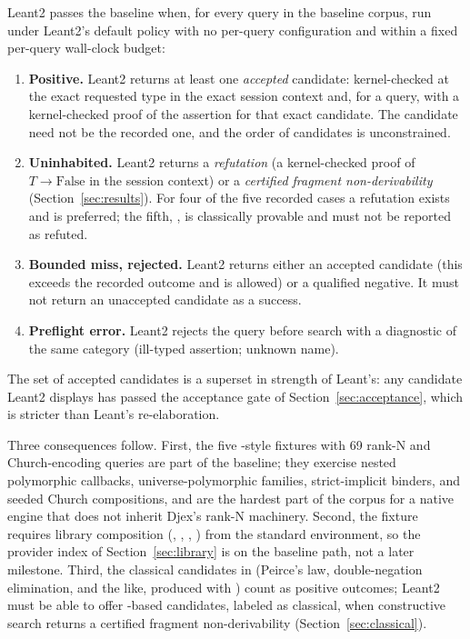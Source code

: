\begin{definition}\label{def:baseline}
Leant2 passes the baseline when, for every query in the baseline corpus, run under Leant2's default policy with no per-query configuration and within a fixed per-query wall-clock budget:
\begin{enumerate}
\item \textbf{Positive.} Leant2 returns at least one \emph{accepted} candidate: kernel-checked at the exact requested type in the exact session context and, for a  query, with a kernel-checked proof of the assertion for that exact candidate. The candidate need not be the recorded one, and the order of candidates is unconstrained.
\item \textbf{Uninhabited.} Leant2 returns a \emph{refutation} (a kernel-checked proof of $T \to \mathrm{False}$ in the session context) or a \emph{certified fragment non-derivability} (Section~\ref{sec:results}). For four of the five recorded cases a refutation exists and is preferred; the fifth, , is classically provable and must not be reported as refuted.
\item \textbf{Bounded miss, rejected.} Leant2 returns either an accepted candidate (this exceeds the recorded outcome and is allowed) or a qualified negative. It must not return an unaccepted candidate as a success.
\item \textbf{Preflight error.} Leant2 rejects the query before search with a diagnostic of the same category (ill-typed assertion; unknown name).
\end{enumerate}
The set of accepted candidates is a superset in strength of Leant's: any candidate Leant2 displays has passed the acceptance gate of Section~\ref{sec:acceptance}, which is stricter than Leant's re-elaboration.
\end{definition}

Three consequences follow. First, the five -style fixtures with 69 rank-N and Church-encoding queries are part of the baseline; they exercise nested polymorphic callbacks, universe-polymorphic families, strict-implicit binders, and seeded Church compositions, and are the hardest part of the corpus for a native engine that does not inherit Djex's rank-N machinery. Second, the  fixture requires library composition (, , , ) from the standard environment, so the provider index of Section~\ref{sec:library} is on the baseline path, not a later milestone. Third, the classical candidates in  (Peirce's law, double-negation elimination, and the like, produced with ) count as positive outcomes; Leant2 must be able to offer -based candidates, labeled as classical, when constructive search returns a certified fragment non-derivability (Section~\ref{sec:classical}).

